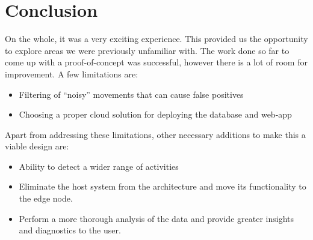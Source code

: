 \documentclass[./main.tex]{subfiles}
\begin{document}
\chapter{Conclusion}
On the whole, it was a very exciting experience. This provided us the
opportunity to explore areas we were previously unfamiliar with. The work done
so far to come up with a proof-of-concept was successful, however there is a
lot of room for improvement. A few limitations are:
\begin{itemize}
    \item Filtering of ``noisy'' movements that can cause false positives
    \item Choosing a proper cloud solution for deploying the database and
        web-app
\end{itemize}

Apart from addressing these limitations, other necessary additions to make this
a viable design are:
\begin{itemize}
    \item Ability to detect a wider range of activities
    \item Eliminate the host system from the architecture and move its
        functionality to the edge node.
    \item Perform a more thorough analysis of the data and provide greater
        insights and diagnostics to the user.
\end{itemize}
\end{document}
